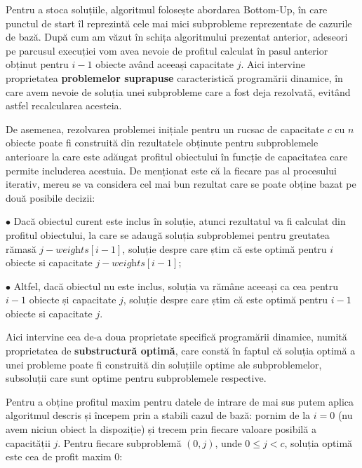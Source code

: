 \begin{sloppypar}
Pentru a stoca soluțiile, algoritmul folosește abordarea \emph{}{Bottom-Up}, în care punctul de start îl reprezintă cele mai mici subprobleme reprezentate de cazurile de bază. După cum am văzut în schița algoritmului prezentat anterior, adeseori pe parcusul execuției vom avea nevoie de profitul calculat în pasul anterior obținut pentru $i - 1$ obiecte având aceeași capacitate $j$. Aici intervine proprietatea \textbf{problemelor suprapuse} caracteristică programării dinamice, în care avem nevoie de soluția unei subprobleme care a fost deja rezolvată, evitând astfel recalcularea acesteia. \par
De asemenea, rezolvarea problemei inițiale pentru un rucsac de capacitate $c$ cu $n$ obiecte poate fi construită din rezultatele obținute pentru subproblemele anterioare la care este adăugat profitul obiectului în funcție de capacitatea care permite includerea acestuia. De menționat este că la fiecare pas al procesului iterativ, mereu se va considera cel mai bun rezultat care se poate obține bazat pe două posibile decizii: \par
$\bullet$ Dacă obiectul curent este inclus în soluție, atunci rezultatul va fi calculat din profitul obiectului, la care se adaugă soluția subproblemei pentru greutatea rămasă $j - \textit{weights}[i - 1]$, soluție despre care știm că este optimă pentru $i$ obiecte si capacitate $j - \textit{weights}[i - 1]$; \par
$\bullet$ Altfel, dacă obiectul nu este inclus, soluția va rămâne aceeași ca cea pentru $i - 1$ obiecte și capacitate $j$, soluție despre care știm că este optimă pentru $i - 1$ obiecte si capacitate $j$. \par
Aici intervine cea de-a doua proprietate specifică programării dinamice, numită proprietatea de \textbf{substructură optimă}, care constă în faptul că soluția optimă a unei probleme poate fi construită din soluțiile optime ale subproblemelor, subsoluții care sunt optime pentru subproblemele respective.
\\ \par
Pentru a obține profitul maxim pentru datele de intrare de mai sus putem aplica algoritmul descris și începem prin a stabili cazul de bază: pornim de la $i = 0$ (nu avem niciun obiect la dispoziție) și trecem prin fiecare valoare posibilă a capacității $j$. Pentru fiecare subproblemă $(0, j)$, unde $0 \le j < c $, soluția optimă este cea de profit maxim 0:



\end{sloppypar}
